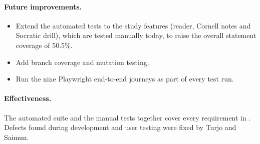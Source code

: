 \paragraph{Future improvements.}
\begin{itemize}
  \item Extend the automated tests to the study features (reader, Cornell notes and Socratic drill), which are
  tested manually today, to raise the overall statement coverage of 50.5\%.
  \item Add branch coverage and mutation testing.
  \item Run the nine Playwright end-to-end journeys as part of every test run.
\end{itemize}

\paragraph{Effectiveness.} The automated suite and the manual tests together cover every requirement in
. Defects found during development and user testing were fixed by Turjo and Saimun.
